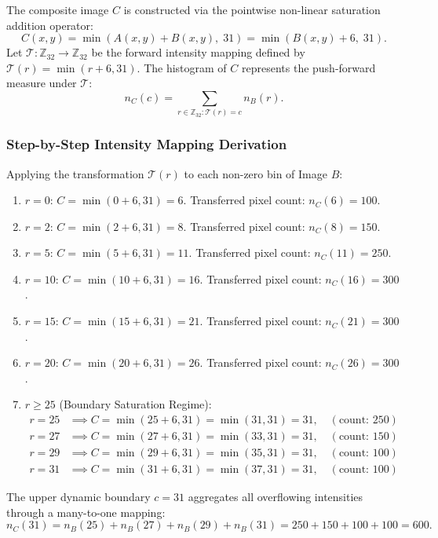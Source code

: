 \documentclass[11pt,a4paper]{article}
\begin{document}
The composite image $C$ is constructed via the pointwise non-linear saturation addition operator:
\begin{equation}
C(x, y) = \min\left( A(x, y) + B(x, y), \; 31 \right) = \min\left( B(x, y) + 6, \; 31 \right).
\end{equation}
Let $\mathcal{T}: \mathbb{Z}_{32} \to \mathbb{Z}_{32}$ be the forward intensity mapping defined by $\mathcal{T}(r) = \min(r + 6, 31)$. The histogram of $C$ represents the push-forward measure under $\mathcal{T}$:
\begin{equation}
n_C(c) = \sum_{r \in \mathbb{Z}_{32} : \mathcal{T}(r) = c} n_B(r).
\end{equation}

\subsubsection{Step-by-Step Intensity Mapping Derivation}
Applying the transformation $\mathcal{T}(r)$ to each non-zero bin of Image $B$:
\begin{enumerate}
    \item $r = 0$: $C = \min(0 + 6, 31) = 6$. Transferred pixel count: $n_C(6) = 100$.
    \item $r = 2$: $C = \min(2 + 6, 31) = 8$. Transferred pixel count: $n_C(8) = 150$.
    \item $r = 5$: $C = \min(5 + 6, 31) = 11$. Transferred pixel count: $n_C(11) = 250$.
    \item $r = 10$: $C = \min(10 + 6, 31) = 16$. Transferred pixel count: $n_C(16) = 300$.
    \item $r = 15$: $C = \min(15 + 6, 31) = 21$. Transferred pixel count: $n_C(21) = 300$.
    \item $r = 20$: $C = \min(20 + 6, 31) = 26$. Transferred pixel count: $n_C(26) = 300$.
    \item $r \ge 25$ (Boundary Saturation Regime):
    \begin{align}
        r = 25 &\implies C = \min(25 + 6, 31) = \min(31, 31) = 31, \quad (\text{count: } 250) \\
        r = 27 &\implies C = \min(27 + 6, 31) = \min(33, 31) = 31, \quad (\text{count: } 150) \\
        r = 29 &\implies C = \min(29 + 6, 31) = \min(35, 31) = 31, \quad (\text{count: } 100) \\
        r = 31 &\implies C = \min(31 + 6, 31) = \min(37, 31) = 31, \quad (\text{count: } 100)
    \end{align}
\end{enumerate}
The upper dynamic boundary $c = 31$ aggregates all overflowing intensities through a many-to-one mapping:
\begin{equation}
n_C(31) = n_B(25) + n_B(27) + n_B(29) + n_B(31) = 250 + 150 + 100 + 100 = 600.
\end{equation}
\end{document}
